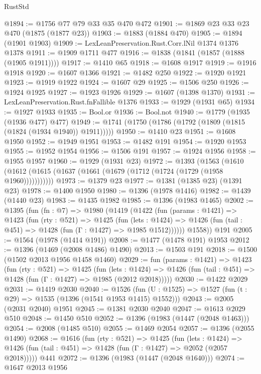 \begin{lexlean}{RustStd}
\begin{coremodule}
{\begin{coremodule}
{{{{{{{{{{{@1894 := @1756 @77 @79 @33 @35 @470 @472
@1901 := @1869 @23 @33 @23 @470 (@1875 (@1877 @23))
@1903 := @1883 (@1884 @470)
@1905 := @1894 (@1901 @1903)
@1909 := LexLeanPreservation.Rust.Corr.lNil @1374 @1376 @1378
@1911 := @1909 @1711 @477
@1916 := @1838 (@1841 (@1857 (@1888 (@1905 @1911))))
@1917 := @1410 @65
@1918 := @1608 @1917
@1919 := @1916 @1918
@1920 := @1607 @1366
@1921 := @1482 @250
@1922 := @1920 @1921
@1923 := @1919 @1922
@1924 := @1607 @29
@1925 := @1506 @250
@1926 := @1924 @1925
@1927 := @1923 @1926
@1929 := @1607 (@1398 @1370)
@1931 := LexLeanPreservation.Rust.fnFallible @1376
@1933 := @1929 (@1931 @65)
@1934 := @1927 @1933
@1935 := Bool.or
@1936 := Bool.not
@1940 := @1779 (@1935 (@1936 @477) @477)
@1949 := @1741 (@1750 (@1786 (@1792 (@1809 (@1815 (@1824 (@1934 @1940)) @1911)))))
@1950 := @1410 @23
@1951 := @1608 @1950
@1952 := @1949 @1951
@1953 := @1482 @191
@1954 := @1920 @1953
@1955 := @1952 @1954
@1956 := @1506 @191
@1957 := @1924 @1956
@1958 := @1955 @1957
@1960 := @1929 (@1931 @23)
@1972 := @1393
    (@1563 (@1610 (@1612 (@1615 (@1637 (@1661 (@1679 (@1712 (@1724 (@1729 (@1958 @1960)))))))))))
@1973 := @1379 @23
@1977 := @1381 (@1385 @23) (@1391 @23)
@1978 := @1400 @1950
@1980 := @1396 (@1978 @1416)
@1982 := @1439 (@1440 @23)
@1983 := @1435 @1982
@1985 := @1396 (@1983 @1465)
@2002 := @1395
    (fun (fn : @7) =>
    @1980
      (@1419
        (@1422
          (fun (params : @1421) =>
          @1423
            (fun (rty : @521) =>
            @1425
              (fun (lets : @1424) =>
              @1426 (fun (tail : @451) => @1428 (fun (Γ : @1427) => @1985 @1512))))))
        @1558))
    @191
@2005 := @1564 (@1978 (@1414 @191))
@2008 := @1477 (@1478 @191) @1953
@2012 := @1396 (@1469 (@2008 @1486) @1490)
@2013 := @1503 @191
@2018 := @1500 (@1502 @2013 @1956 @1458 @1460)
@2029 := fun (params : @1421) =>
  @1423
    (fun (rty : @521) =>
    @1425
      (fun (lets : @1424) =>
      @1426 (fun (tail : @451) => @1428 (fun (Γ : @1427) => @1985 (@2012 @2018)))))
@2030 := @1422 @2029
@2031 := @1419 @2030
@2040 := @1526 (fun (U : @1525) => @1527 (fun (t : @29) => @1535 (@1396 (@1541 @1953 @1415) @1552)))
@2043 := @2005 (@2031 @2040) @1951
@2045 := @1381 @2030 @2040
@2047 := @1613 @2029 @510
@2048 := @1450 @510
@2052 := @1396 (@1983 (@1447 (@2048 @1463)))
@2054 := @2008 (@1485 @510)
@2055 := @1469 @2054
@2057 := @1396 (@2055 @1490)
@2068 := @1616
    (fun (rty : @521) =>
    @1425
      (fun (lets : @1424) =>
      @1426 (fun (tail : @451) => @1428 (fun (Γ : @1427) => @2052 (@2057 @2018)))))
    @441
@2072 := @1396 (@1983 (@1447 (@2048 @1640)))
@2074 := @1647 @2013 @1956
}}}}}}}}}}}
\end{coremodule}}
\end{coremodule}
\end{lexlean}
